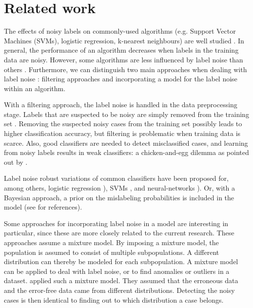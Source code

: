 \documentclass[12pt, a4paper, titlepage]{article}
\begin{document}


							\section{Related work}
							\label{section:related}

The effects of noisy labels on commonly-used algorithms (e.g. Support Vector Machines (SVMs), logistic regression, k-nearest neighbours) are well studied \citep{Pech, Nettleton}. In general, the performance of an algorithm decreases when labels in the training data are noisy. However, some algorithms are less influenced by label noise than others \citep{Frenay}. Furthermore, we can distinguish two main approaches when dealing with label noise \citep{Frenay}: filtering approaches and  incorporating a model for the label noise within an algorithm. 

With a filtering approach, the label noise is handled in the data preprocessing stage. Labels that are suspected to be noisy are simply removed from the training set \citep{Brodley}. Removing the suspected noisy cases from the training set possibly leads to higher classification accuracy, but filtering is problematic when training data is scarce. Also, good classifiers are needed to detect misclassified cases, and learning from noisy labels results in weak classifiers: a chicken-and-egg dilemma as pointed out by \citet{Angelova}.

Label noise robust variations of common classifiers have been proposed for, among others, logistic regression \citep{Bootkrajang, Rantalainen}), SVMs \citep{Stempfel}, and neural-networks \citep{Sigurdsson, Sukhbaatar}). Or, with a Bayesian approach, a prior on the mislabeling probabilities is included in the model (see \citet{Frenay} for references).

Some approaches for incorporating label noise in a model are interesting in particular, since these are more closely related to the current research. These approaches assume a mixture model. By imposing a mixture model, the population is assumed to consist of multiple subpopulations. A different distribution can thereby be modeled for each subpopulation. A mixture model can be applied to deal with label noise, or to find anomalies or outliers in a dataset. \citet{DiZio, Eskin} applied such a mixture model. They assumed that the erroneous data and the error-free data came from different distributions. Detecting the noisy cases is then identical to finding out to which distribution a case belongs.
\end{document}
